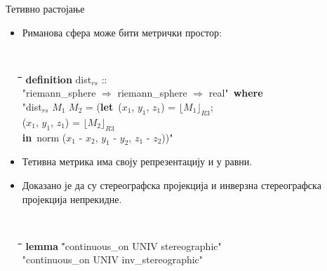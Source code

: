 \documentclass[slidestop, compress, mathserif, containsverbatim, xcolor=dvipsnames]{beamer}
\newcommand{\Reprs}[1]{\ensuremath{\lfloor#1\rfloor_{R3}}}
\begin{document}
\begin{frame}{Тетивно растојање}
  \begin{itemize}
  \item Риманова сфера може бити метрички простор:
    \begin{footnotesize} {\tt
      \begin{tabbing}
        \hspace{5mm}\=\hspace{5mm}\=\hspace{5mm}\=\hspace{5mm}\=\hspace{5mm}\=\hspace{5mm}\=\hspace{5mm}\=\hspace{5mm}\=\hspace{5mm}\=\hspace{5mm}\=\kill
        {\bf definition} dist$_{rs}$ :: \\
        \>"{}riemann\_sphere $\Rightarrow$ riemann\_sphere $\Rightarrow$ real"\ {\bf where}\\
        \>  "{}dist$_{rs}$ $M_1$ $M_2$ = ({\bf let}\ ($x_1$, $y_1$, $z_1$) = $\Reprs{M_1}$; \\
        \>\>\>\>\>\>\>\> ($x_1$, $y_1$, $z_1$) = $\Reprs{M_2}$\\
    \>\>       {\bf in}\ norm ($x_1$ - $x_2$, $y_1$ - $y_2$, $z_1$ - $z_2$))"
      \end{tabbing}
      } \end{footnotesize} \vfill
  \item Тетивна метрика има своју репрезентацију и у равни. \vfill
  \item Доказано је да су стереографска пројекција и инверзна
    стереографска пројекција непрекидне.  
    \begin{footnotesize} {\tt
      \begin{tabbing}
        \hspace{5mm}\=\hspace{5mm}\=\hspace{5mm}\=\hspace{5mm}\=\hspace{5mm}\=\kill
        {\bf lemma} \="{}continuous\_on UNIV stereographic" \\
        \> "{}continuous\_on UNIV inv\_stereographic"
      \end{tabbing}
    } \end{footnotesize}
  \end{itemize}
\end{frame}
\end{document}
